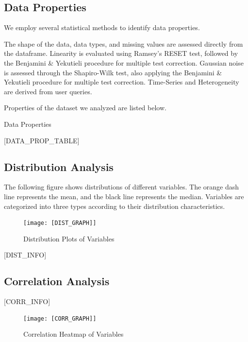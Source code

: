 \documentclass{article}
\begin{document}
\subsection{Data Properties}
We employ several statistical methods to identify data properties.

The shape of the data, data types, and missing values are assessed directly from the dataframe.
Linearity is evaluated using Ramsey’s RESET test, followed by the Benjamini \& Yekutieli procedure for multiple test correction.
Gaussian noise is assessed through the Shapiro-Wilk test, also applying the Benjamini \& Yekutieli procedure for multiple test correction.
Time-Series and Heterogeneity are derived from user queries.

Properties of the dataset we analyzed are listed below.

\begin{table}[H]
    \centering
    \caption{Data Properties}
[DATA_PROP_TABLE]
\end{table}


\subsection{Distribution Analysis}
The following figure shows distributions of different variables. The orange dash line represents the mean, 
and the black line represents the median. Variables are categorized into three types according to their distribution characteristics.

\begin{figure}[H]
\centering
\vspace{-0.5cm}
\texttt{[image: [DIST\_GRAPH]]}
\caption{\label{fig:dist}Distribution Plots of Variables}
\end{figure}

[DIST_INFO]

\subsection{Correlation Analysis}

\begin{minipage}[t]{0.5\linewidth}
    [CORR_INFO]
\vfill
\end{minipage}
\hfill
\begin{minipage}[t]{0.5\linewidth}
    \begin{figure}[H]
        \centering
        \vspace{-1.5cm}
        \texttt{[image: [CORR\_GRAPH]]}
        \caption{\label{fig:corr}Correlation Heatmap of Variables}
    \end{figure}
\end{minipage}
\end{document}
